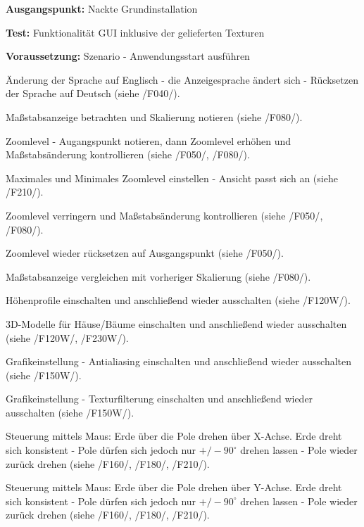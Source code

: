 \documentclass[10pt]{scrreprt}
\newcommand{\sfbf}[1]{\textbf{\sffamily #1}}
\newcommand{\ziel}[1]{{\fontsize{9.5}{11}\textsf{/#1/}}}
\newcommand{\ziellabel}{Z}
\newcommand{\muss}{\renewcommand{\labelenumi}{\textbf{\ziel{\ziellabel\numprint{\theenumi}0}}}}
\newcommand{\wunsch}{\renewcommand{\labelenumi}{\textbf{\ziel{\ziellabel\numprint{\theenumi}0W}}}}
\newenvironment{details}[1][6pt]{%
  \parskip#1 \parindent6mm \raggedright%
  \def\item{\par\ignorespaces\hangindent=5mm \hangafter1}}{%
  \par\ignorespaces}
\begin{document}
\vspace{1.0cm}
\begin{details}[2pt]
\item \sfbf{Ausgangspunkt:} Nackte Grundinstallation 
\item \sfbf{Test:} Funktionalität GUI inklusive der gelieferten Texturen 
\item \sfbf{Voraussetzung:} Szenario - Anwendungsstart ausführen
\end{details}
\vspace{2mm}
\begin{enumerate}[leftmargin = 2.2cm, resume]
\item Änderung der Sprache auf Englisch - die Anzeigesprache ändert sich - Rücksetzen der Sprache auf Deutsch (siehe \ziel{F040}).
\item Maßstabsanzeige betrachten und Skalierung notieren (siehe \ziel{F080}).
\item Zoomlevel - Augangspunkt notieren, dann Zoomlevel erhöhen und Maßstabsänderung kontrollieren (siehe \ziel{F050}, \ziel{F080}).
\item Maximales und Minimales Zoomlevel einstellen - Ansicht passt sich an (siehe \ziel{F210}).
\item Zoomlevel verringern und Maßstabsänderung kontrollieren (siehe \ziel{F050}, \ziel{F080}).
\item Zoomlevel wieder rücksetzen auf Ausgangspunkt (siehe \ziel{F050}).
\item Maßstabsanzeige vergleichen mit vorheriger Skalierung (siehe \ziel{F080}).
\wunsch
\item Höhenprofile einschalten und anschließend wieder ausschalten (siehe \ziel{F120W}).
\item 3D-Modelle für Häuse/Bäume einschalten und anschließend wieder ausschalten (siehe \ziel{F120W}, \ziel{F230W}).
\item Grafikeinstellung - Antialiasing einschalten und anschließend wieder ausschalten (siehe \ziel{F150W}).
\item Grafikeinstellung - Texturfilterung einschalten und anschließend wieder ausschalten (siehe \ziel{F150W}).
\muss
\item Steuerung mittels Maus: Erde über die Pole drehen über X-Achse. Erde dreht sich konsistent - Pole dürfen sich jedoch nur $+/- 90^\circ$ drehen lassen - Pole wieder zurück drehen (siehe \ziel{F160}, \ziel{F180}, \ziel{F210}).
\item Steuerung mittels Maus: Erde über die Pole drehen über Y-Achse. Erde dreht sich konsistent - Pole dürfen sich jedoch nur $+/- 90^\circ$ drehen lassen - Pole wieder zurück drehen (siehe \ziel{F160}, \ziel{F180}, \ziel{F210}).

\end{enumerate}
\end{document}
